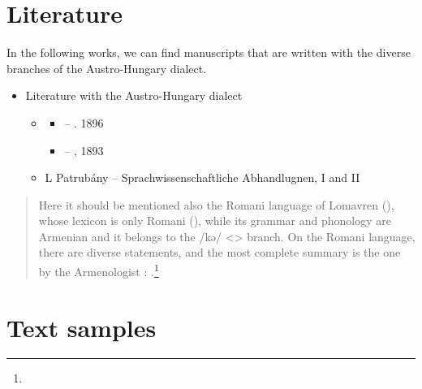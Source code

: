 \section{Literature}\label{sectiopn:AustroHungary:Lit}

{\litoverview}


In the following works, we can find manuscripts that are written with the diverse branches of the Austro-Hungary dialect. 




\begin{itemize}
	\item Literature with the Austro-Hungary dialect
	\begin{itemize}
		\item {} 
		\begin{itemize}
			\item – . 1896
			\item – , 1893
		\end{itemize}
		\item L Patrubány – Sprachwissenschaftliche Abhandlugnen, I and II
\end{itemize}\end{itemize}




\begin{quote}
	Here it should be mentioned also the Romani language of Lomavren (), whose lexicon is only Romani (), while its grammar and phonology are Armenian and it belongs to the /kə/ <> branch. On the Romani language, there are diverse statements, and the most complete summary is the one by the Armenologist : \citealt{Finck-1907-SpracheRomani}.\footnote{}
\end{quote}


\begin{adjarianpage}\label{page:273}\end{adjarianpage}%

\section{Text samples}

